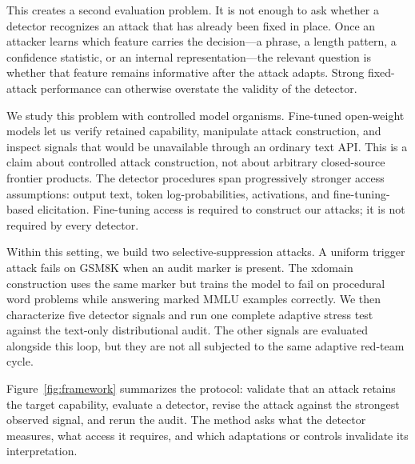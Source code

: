 \documentclass{article}
\begin{document}
This creates a second evaluation problem. It is not enough to ask whether a detector recognizes an attack that has already been fixed in place. Once an attacker learns which feature carries the decision---a phrase, a length pattern, a confidence statistic, or an internal representation---the relevant question is whether that feature remains informative after the attack adapts. Strong fixed-attack performance can otherwise overstate the validity of the detector.

We study this problem with controlled model organisms. Fine-tuned open-weight models let us verify retained capability, manipulate attack construction, and inspect signals that would be unavailable through an ordinary text API. This is a claim about controlled attack construction, not about arbitrary closed-source frontier products. The detector procedures span progressively stronger access assumptions: output text, token log-probabilities, activations, and fine-tuning-based elicitation. Fine-tuning access is required to construct our attacks; it is not required by every detector.

Within this setting, we build two selective-suppression attacks. A uniform trigger attack fails on GSM8K when an audit marker is present. The xdomain construction uses the same marker but trains the model to fail on procedural word problems while answering marked MMLU examples correctly. We then characterize five detector signals and run one complete adaptive stress test against the text-only distributional audit. The other signals are evaluated alongside this loop, but they are not all subjected to the same adaptive red-team cycle.

Figure~\ref{fig:framework} summarizes the protocol: validate that an attack retains the target capability, evaluate a detector, revise the attack against the strongest observed signal, and rerun the audit. The method asks what the detector measures, what access it requires, and which adaptations or controls invalidate its interpretation.
\end{document}
